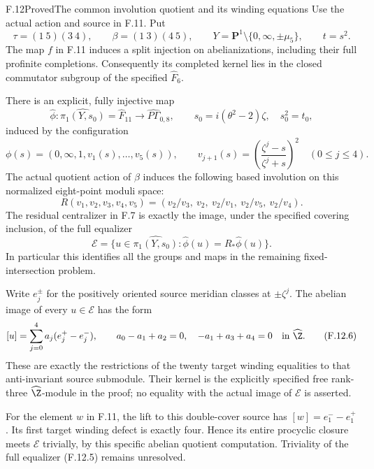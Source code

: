 \begin{claim}{F.12}{Proved}{The common involution quotient and its winding equations}
Use the actual action and source in F.11.  Put
\[
 \tau=(1\ 5)(3\ 4),\qquad
 \beta=(1\ 3)(4\ 5),\qquad
 Y=\mathbf P^1\setminus\{0,\infty,\pm\mu_5\},
               \qquad t=s^2 .
                                                               \tag{F.12.1}
\]
The map $f$ in F.11 induces a split injection on
abelianizations, including their full profinite
completions.  Consequently its completed kernel
lies in the closed commutator subgroup of the
specified $\widehat F_6$.

There is an explicit, fully injective map
\[
 \widehat\phi:\widehat{\pi_1(Y,s_0)}
                     =\widehat F_{11}
                   \longrightarrow\widehat{P\Gamma}_{0,8},
 \qquad
 s_0=i(\theta^2-2)\zeta,\quad s_0^2=t_0,
                                                               \tag{F.12.2}
\]
induced by the configuration
\[
 \phi(s)=(0,\infty,1,v_1(s),\ldots,v_5(s)),
 \qquad
 v_{j+1}(s)=
       \left(\frac{\zeta^j-s}{\zeta^j+s}\right)^2
                         \quad(0\leq j\leq4).
                                                               \tag{F.12.3}
\]
The actual quotient action of $\beta$ induces
the following based involution on this normalized
eight-point moduli space:
\[
 R(v_1,v_2,v_3,v_4,v_5)
       =(v_2/v_3,\ v_2,\ v_2/v_1,\ v_2/v_5,\ v_2/v_4).
                                                               \tag{F.12.4}
\]
The residual centralizer in F.7 is exactly the
image, under the specified covering inclusion,
of the full equalizer
\[
 \mathcal E=
 \{u\in\widehat{\pi_1(Y,s_0)}:
                    \widehat\phi(u)=R_*\widehat\phi(u)\}.
                                                               \tag{F.12.5}
\]
In particular this identifies all the groups and
maps in the remaining fixed-intersection problem.

Write $e_j^\pm$ for the positively oriented source
meridian classes at $\pm\zeta^j$.  The abelian
image of every $u\in\mathcal E$ has the form
\[
        [u]=\sum_{j=0}^4 a_j(e_j^+-e_j^-),\qquad
        a_0-a_1+a_2=0,\quad -a_1+a_3+a_4=0
                  \quad\hbox{in }\widehat\Z.
                                                               \tag{F.12.6}
\]
These are exactly the restrictions of the twenty
target winding equalities to that anti-invariant
source submodule.  Their kernel is the explicitly
specified free rank-three $\widehat\Z$-module
in the proof; no equality with the actual image
of $\mathcal E$ is asserted.

For the element $w$ in F.11, the lift to this
double-cover source has
$[w]=e_1^- -e_1^+$.
Its first target winding defect is exactly four.
Hence its entire procyclic closure meets
$\mathcal E$ trivially, by this specific
abelian quotient computation.
Triviality of the full equalizer (F.12.5)
remains unresolved.
\end{claim}

